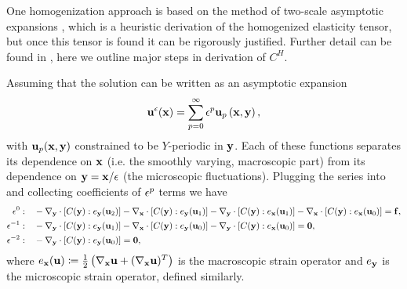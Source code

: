 \documentclass[twocolumn,10pt]{article}
\begin{document}
One homogenization approach is based on the method of two-scale
asymptotic expansions \cite{allaire2002shape}, which is a heuristic
derivation of the homogenized elasticity tensor, but once this tensor
is found it can be rigorously justified. Further detail can be found
in \cite{allaire2002shape}, here we outline major steps in derivation
of $C^H$.

Assuming that the solution can be written as an asymptotic expansion
\[
\mathbf u^\epsilon({\mathbf x}) = \sum_{p = 0}^{\infty} \epsilon^p \mathbf u_p\left(\mathbf x, \mathbf y\right),
\]
with ${\bf u}_p({\mathbf x}, {\mathbf y})$ constrained to be $Y$-periodic in
${\mathbf y}$.  Each of these functions separates its dependence on $\mathbf x$
(i.e. the smoothly varying, macroscopic part) from its dependence on
$\mathbf y = \mathbf x/\epsilon$ (the microscopic fluctuations). Plugging the series into
 and collecting coefficients of $\epsilon^p$ terms we
have
\begin{align}
    \epsilon^{ 0}:\quad  &-\nabla_{\mathbf y} \cdot [C({\mathbf y}) : e_{\mathbf y}({\bf u}_2)] -
                     \nabla_{\mathbf x} \cdot [C({\mathbf y}) : e_{\mathbf y}({\bf u}_1)] -
                     \nabla_{\mathbf y} \cdot [C({\mathbf y}) : e_{\mathbf x}({\bf u}_1)] -
                     \nabla_{\mathbf x} \cdot [C({\mathbf y}) : e_{\mathbf x}({\bf u}_0)] = {\bf f}, \label{eqn:e0}\\
    \epsilon^{-1}:\quad  &-\nabla_{\mathbf y} \cdot [C({\mathbf y}) : e_{\mathbf y}({\bf u}_1)] -
                     \nabla_{\mathbf x} \cdot [C({\mathbf y}) : e_{\mathbf y}({\bf u}_0)] -
                     \nabla_{\mathbf y} \cdot [C({\mathbf y}) : e_{\mathbf x}({\bf u}_0)] = {\bf 0}, \label{eqn:em1} \\
    \epsilon^{-2}:\quad  &-\nabla_{\mathbf y} \cdot [C({\mathbf y}) : e_{\mathbf y}({\bf u}_0)] = {\bf 0}, \label{eqn:em2}
\end{align}
where $e_{\mathbf x}({\bf u}) \coloneqq \frac{1}{2} \left( \nabla_{\mathbf x} {\bf u}
+ (\nabla_{\mathbf x} {\bf u})^T \right)$ is the macroscopic strain operator
and $e_{\mathbf y}$ is the microscopic strain operator, defined similarly.
\end{document}
